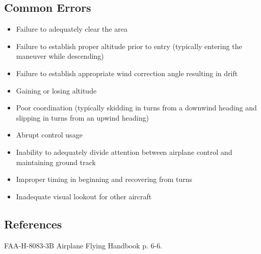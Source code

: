 \subsection{Common Errors}

\begin{itemize}
  \item Failure to adequately clear the area
  \item Failure to establish proper altitude prior to entry (typically entering
    the maneuver while descending)
  \item Failure to establish appropriate wind correction angle resulting in
    drift
  \item Gaining or losing altitude
  \item Poor coordination (typically skidding in turns from a downwind heading
    and slipping in turns from an upwind heading)
  \item Abrupt control usage
  \item Inability to adequately divide attention between airplane control and
    maintaining ground track
  \item Improper timing in beginning and recovering from turns
  \item Inadequate visual lookout for other aircraft
\end{itemize}

\subsection{References}

FAA-H-8083-3B Airplane Flying Handbook p. 6-6.

